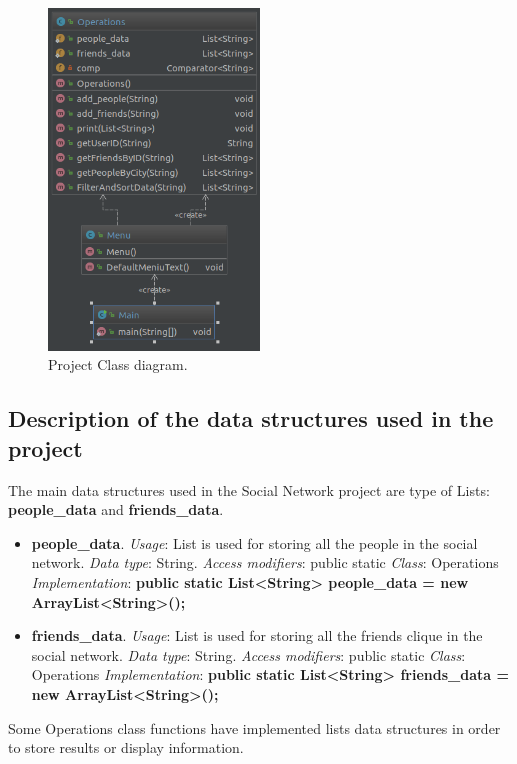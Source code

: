 \documentclass[a4paper]{article}
\begin{document}
\begin{figure}[H]
\centering
\includegraphics[width=0.5\textwidth]{Class_diagram.png}
\caption{\label{fig:class_dia}Project Class diagram.}
\end{figure}

\subsection{Description of the data structures used in the project}
The main data structures used in the Social Network project are type of Lists: \textbf{people\_data} and \textbf{friends\_data}.
\begin{itemize} 
\item \textbf{people\_data}.
\subitem \textit{Usage}: List is used for storing all the people in the social network.
\subitem \textit{Data type}: String.
\subitem \textit{Access modifiers}: public static
\subitem \textit{Class}: Operations
\subitem \textit{Implementation}: \textbf{public static List\textless{}String\textgreater{} people\_data = new ArrayList\textless{}String\textgreater{}();}
\item \textbf{friends\_data}.
\subitem \textit{Usage}: List is used for storing all the friends clique in the social network.
\subitem \textit{Data type}: String.
\subitem \textit{Access modifiers}: public static
\subitem \textit{Class}: Operations
\subitem \textit{Implementation}: \textbf{public static List\textless{}String\textgreater{} friends\_data = new ArrayList\textless{}String\textgreater{}();}
\end{itemize}
Some Operations class functions have implemented lists data structures in order to store results or display information.
\end{document}
